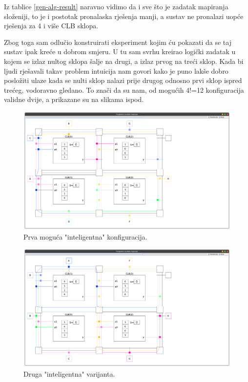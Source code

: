 \documentclass[times, utf8, zavrsni]{fer}
\begin{document}
		Iz tablice \ref{gen-alg-result} naravno vidimo da i sve što je zadatak mapiranja složeniji, to je i postotak pronalaska rješenja manji, a sustav ne pronalazi uopće rješenja za 4 i više CLB sklopa. 
		
		Zbog toga sam odlučio konstruirati eksperiment kojim ću pokazati da se taj sustav ipak kreće u dobrom smjeru. U tu sam svrhu kreirao logički zadatak u kojem se izlaz nultog sklopa šalje na drugi, a izlaz prvog na treći sklop. Kada bi ljudi rješavali takav problem intuicija nam govori kako je puno lakše dobro posložiti ulaze kada se nulti sklop nalazi prije drugog odnosno prvi sklop ispred trećeg, vodoravno gledano. To znači da su nam, od mogućih 4!=12 konfiguracija validne dvije, a prikazane su na slikama ispod.
		
		
		\begin{figure}[H]
			\centering
			\includegraphics[width=18cm]{slike/conf1.png}
			\caption{Prva moguća "inteligentna" konfiguracija. }
			\label{fig:conf1}
		\end{figure} 
		
		
		\begin{figure}[H]
			\centering
			\includegraphics[width=18cm]{slike/conf2.png}
			\caption{Druga "inteligentna" varijanta. }
			\label{fig:conf2}
		\end{figure} 
		
\end{document}
